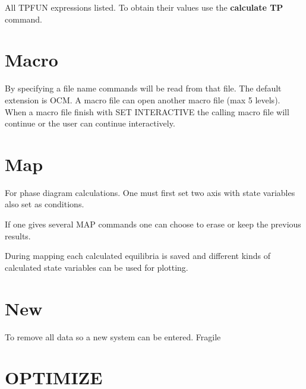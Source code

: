 \documentclass[12pt]{article}
\begin{document}
All TPFUN expressions listed.  To obtain their values use the {\bf
  calculate TP} command.

\section{Macro }

By specifying a file name commands will be read from that file.  The
default extension is OCM.  A macro file can open another macro file
(max 5 levels).  When a macro file finish with SET INTERACTIVE the
calling macro file will continue or the user can continue
interactively.

\section{Map }

For phase diagram calculations.  One must first set two axis with
state variables also set as conditions.

If one gives several MAP commands one can choose to erase or keep the
previous results.

During mapping each calculated equilibria is saved and different kinds
of calculated state variables can be used for plotting.

\section{New }

To remove all data so a new system can be entered.  Fragile

\section{OPTIMIZE}
\end{document}
